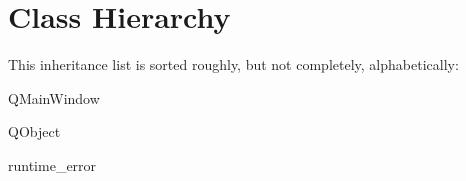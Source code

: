 \section{Class Hierarchy}
This inheritance list is sorted roughly, but not completely, alphabetically\+:\begin{DoxyCompactList}
\item {}
\begin{DoxyCompactList}
\item {}
\end{DoxyCompactList}
\item Q\+Main\+Window\begin{DoxyCompactList}
\item {}
\item {}
\end{DoxyCompactList}
\item Q\+Object\begin{DoxyCompactList}
\item {}
\end{DoxyCompactList}
\item runtime\+\_\+error\begin{DoxyCompactList}
\item {}
\end{DoxyCompactList}
\end{DoxyCompactList}
